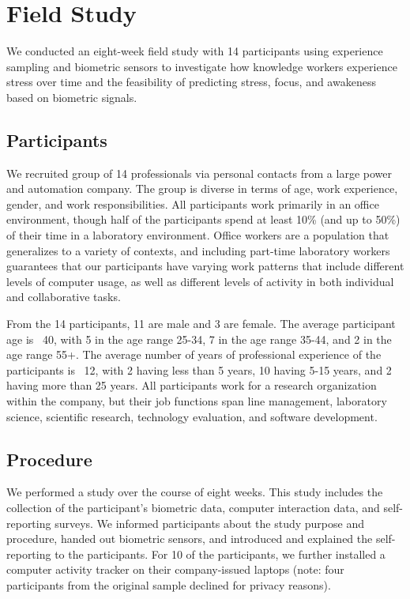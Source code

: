 \section{Field Study}
We conducted an eight-week field study with 14 participants using experience sampling and biometric sensors to investigate how knowledge workers experience stress over time and the feasibility of predicting stress, focus, and awakeness based on biometric signals. 


\subsection{Participants}
We recruited group of 14 professionals via personal contacts from a large power and automation company. The group is diverse in terms of age, work experience, gender, and work responsibilities. All participants work primarily in an office environment, though half of the participants spend at least 10\% (and up to 50\%) of their time in a laboratory environment. Office workers are a population that generalizes to a variety of contexts, and including part-time laboratory workers guarantees that our participants have varying work patterns that include different levels of computer usage, as well as different levels of activity in both individual and collaborative tasks.

From the 14 participants, 11 are male and 3 are female. The average participant age is ~40, with 5 in the age range 25-34, 7 in the age range 35-44, and 2 in the age range 55+. The average number of years of professional experience of the participants is ~12, with 2 having less than 5 years, 10 having 5-15 years, and 2 having more than 25 years. All participants work for a research organization within the company, but their job functions span line management, laboratory science, scientific research, technology evaluation, and software development.


\subsection{Procedure}
We performed a study over the course of eight weeks. This study includes the collection of the participant's biometric data, computer interaction data, and self-reporting surveys. We informed participants about the study purpose and procedure, handed out biometric sensors, and introduced and explained the self-reporting to the participants. For 10 of the participants, we further installed a computer activity tracker on their company-issued laptops (note: four participants from the original sample declined for privacy reasons). 

